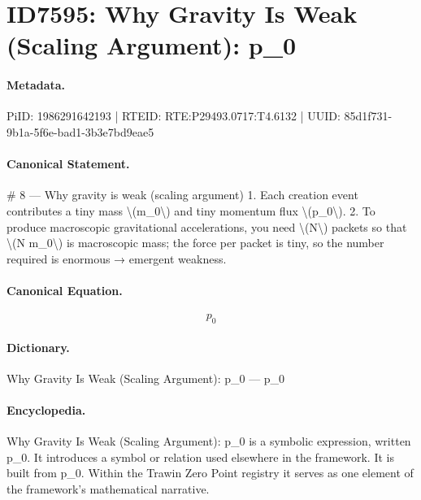 \section*{ID7595: Why Gravity Is Weak (Scaling Argument): p\_0}
\paragraph{Metadata.}
PiID: 1986291642193 | RTEID: RTE:P29493.0717:T4.6132 | UUID: 85d1f731-9b1a-5f6e-bad1-3b3e7bd9eae5

\paragraph{Canonical Statement.}
\# 8 — Why gravity is weak (scaling argument) 1. Each creation event contributes a tiny mass \textbackslash{}(m\_0\textbackslash{}) and tiny momentum flux \textbackslash{}(p\_0\textbackslash{}). 2. To produce macroscopic gravitational accelerations, you need \textbackslash{}(N\textbackslash{}) packets so that \textbackslash{}(N m\_0\textbackslash{}) is macroscopic mass; the force per packet is tiny, so the number required is enormous → emergent weakness.

\paragraph{Canonical Equation.}
\[
p_0
\]

\paragraph{Dictionary.}
Why Gravity Is Weak (Scaling Argument): p\_0 — p\_0

\paragraph{Encyclopedia.}
Why Gravity Is Weak (Scaling Argument): p\_0 is a symbolic expression, written p\_0. It introduces a symbol or relation used elsewhere in the framework. It is built from p\_0. Within the Trawin Zero Point registry it serves as one element of the framework's mathematical narrative.
